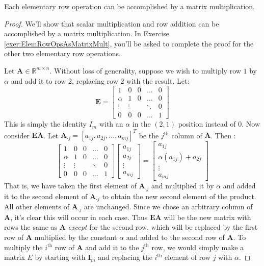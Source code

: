 \begin{theorem} Each elementary row operation can be accomplished by a matrix multiplication.
\label{thm:ElemRowOpsAsMatrixMult}
\end{theorem}
\begin{proof} We'll show that scalar multiplication and row addition can be accomplished by a matrix multiplication. In Exercise \ref{exer:ElemRowOpsAsMatrixMult}, you'll be asked to complete the proof for the other two elementary row operations.

Let $\mathbf{A} \in \mathbb{R}^{m \times n}$. Without loss of generality, suppose we wish to multiply row $1$ by $\alpha$ and add it to row $2$, replacing row $2$ with the result. Let:
\begin{equation}
\mathbf{E} = \begin{bmatrix}
1 & 0 & 0 & \dots & 0\\
\alpha & 1 & 0 & \dots & 0\\
\vdots & \vdots & & \ddots & 0\\
0 & 0 & 0 & \dots & 1
\end{bmatrix}
\end{equation}
This is simply the identity $I_m$ with an $\alpha$ in the $(2,1)$ position instead of $0$. Now consider $\mathbf{E}\mathbf{A}$. Let $\mathbf{A}_{\cdot j} = [a_{1j},a_{2j},\dots,a_{mj}]^T$ be the $j^\text{th}$ column of $\mathbf{A}$. Then :
\begin{equation}
\begin{bmatrix}
1 & 0 & 0 & \dots & 0\\
\alpha & 1 & 0 & \dots & 0\\
\vdots & \vdots & & \ddots & 0\\
0 & 0 & 0 & \dots & 1
\end{bmatrix}
\begin{bmatrix}
a_{1j}\\
a_{2j}\\
\vdots\\
a_{mj}
\end{bmatrix} = 
\begin{bmatrix}
a_{1j}\\
\alpha(a_{1j}) + a_{2j}\\
\vdots\\
a_{mj}
\end{bmatrix}
\end{equation}
That is, we have taken the first element of $\mathbf{A}_{\cdot j}$ and multiplied it by $\alpha$ and added it to the second element of $\mathbf{A}_{\cdot j}$ to obtain the new second element of the product. All other elements of $\mathbf{A}_{\cdot j}$ are unchanged. Since we chose an arbitrary column of $\mathbf{A}$, it's clear this will occur in each case. Thus $\mathbf{E} \mathbf{A}$ will be the new matrix with rows the same as $\mathbf{A}$ \textit{except} for the second row, which will be replaced by the first row of $\mathbf{A}$ multiplied by the constant $\alpha$ and added to the second row of $\mathbf{A}$. To multiply the $i^\text{th}$ row of $\mathbf{A}$ and add it to the $j^\text{th}$ row, we would simply make a matrix $E$ by starting with $\mathbf{I}_m$ and replacing the $i^\text{th}$ element of row $j$ with $\alpha$.  
\end{proof}
